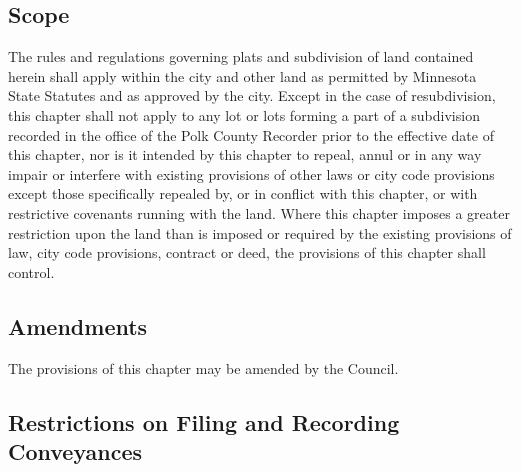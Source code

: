 \subsection{Scope}
The rules and regulations governing plats and subdivision of land contained herein shall apply within the city and other land as permitted by Minnesota State Statutes and as approved by the city. Except in the case of resubdivision, this chapter shall not apply to any lot or lots forming a part of a subdivision recorded in the office of the Polk County Recorder prior to the effective date of this chapter, nor is it intended by this chapter to repeal, annul or in any way impair or interfere with existing provisions of other laws or city code provisions except those specifically repealed by, or in conflict with this chapter, or with restrictive covenants running with the land. Where this chapter imposes a greater restriction upon the land than is imposed or required by the existing provisions of law, city code provisions, contract or deed, the provisions of this chapter shall control.
\subsection{Amendments}
The provisions of this chapter may be amended by the Council.
\subsection{Restrictions on Filing and Recording Conveyances}
